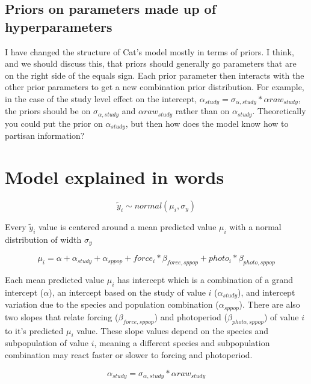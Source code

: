 \documentclass[11pt,letter]{article}
\begin{document}
\subsection{Priors on parameters made up of hyperparameters}
I have changed the structure of Cat's model mostly in terms of priors. I think, and we should discuss this, that priors should generally go parameters that are on the right side of the equals sign. Each prior parameter then interacts with the other prior parameters to get a new combination prior distribution. For example, in the case of the study level effect on the intercept, $\alpha_{study} =  \sigma_{\alpha, study} * \alpha raw_{study}$, the priors should be on $ \sigma_{\alpha, study}$ and $\alpha raw_{study}$ rather than on $\alpha_{study} $. Theoretically you could put the prior on $\alpha_{study} $, but then how does the model know how to partisan information?

\section{Model explained in words}



\begin{equation}
\tilde{y}_{i}\sim normal(\mu_{i},\sigma_{y})
\end{equation}

Every $\tilde{y}_{i}$ value is centered around a mean predicted value $\mu_{i}$ with a normal distribution of width $\sigma_{y}$

\begin{equation}
\mu_{i} = \alpha + \alpha_{study} + \alpha_{sppop} + force_{i} * \beta _{force,sppop} + photo_{i} * \beta _{photo,sppop} 
\end{equation}

Each mean predicted value $\mu_{i}$ has intercept which is a combination of a grand intercept ($\alpha$), an intercept based on the study of value $i$ ($\alpha_{study}$), and intercept variation due to the species and population combination ($\alpha_{sppop}$). There are also two slopes that relate forcing ($\beta _{force,sppop} $) and photoperiod ($\beta _{photo,sppop} $) of value $i$ to it's predicted $\mu_{i}$ value. These slope values depend on the species and subpopulation of value $i$, meaning a different species and subpopulation combination may react faster or slower to forcing and photoperiod. 

\begin{equation}
\alpha_{study} = \sigma_{\alpha, study} * \alpha raw_{study}
\end{equation}
\end{document}
